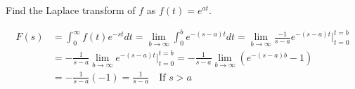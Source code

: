 \documentclass[notes]{subfiles}
\begin{document}
\begin{exercise}
    Find the Laplace transform of $f$ as $f(t) = e^{at}$.
\end{exercise}
\begin{solution}
    \begin{align*}
        F(s)
        &= \int_0^\infty f(t)e^{-st}dt
        = \lim_{b\to\infty} \int_0^b e^{-(s - a)t}dt
        = \lim_{b\to\infty} \frac{-1}{s - a} e^{-(s - a)t}\Big|_{t = 0}^{t = b} \\
        &= -\frac{1}{s - a} \lim_{b\to\infty} e^{-(s - a)t}\Big|_{t = 0}^{t = b}
        = -\frac{1}{s - a} \lim_{b\to\infty} (e^{-(s - a)b} - 1) \\
        &= -\frac{1}{s - a}(-1) = \frac{1}{s - a} \quad \text{If $s > a$}
    \end{align*}
\end{solution}
\end{document}
